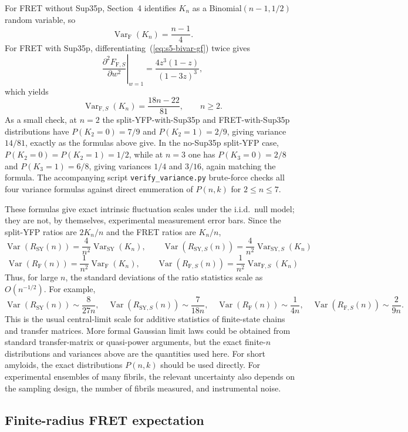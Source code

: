 \documentclass[11pt]{article}
\begin{document}
For FRET without Sup35p, Section~4 identifies $K_n$ as a Binomial$(n-1,1/2)$ random variable, so
\[
\operatorname{Var}_{\text{F}}(K_n)=\frac{n-1}{4}.
\]
For FRET with Sup35p, differentiating~(\ref{eq:s5-bivar-gf}) twice gives
\[
\left. \frac{\partial^2 F_{\text{F},S}}{\partial w^2} \right|_{w=1}
= \frac{4z^3(1-z)}{(1-3z)^3},
\]
which yields
\[
\operatorname{Var}_{\text{F},S}(K_n)=\frac{18n-22}{81},
\qquad n \ge 2.
\]
As a small check, at $n=2$ the split-YFP-with-Sup35p and FRET-with-Sup35p distributions have $P(K_2=0)=7/9$ and $P(K_2=1)=2/9$, giving variance $14/81$, exactly as the formulas above give. In the no-Sup35p split-YFP case, $P(K_2=0)=P(K_2=1)=1/2$, while at $n=3$ one has $P(K_3=0)=2/8$ and $P(K_3=1)=6/8$, giving variances $1/4$ and $3/16$, again matching the formula. The accompanying script \texttt{verify\_variance.py} brute-force checks all four variance formulas against direct enumeration of $P(n,k)$ for $2 \le n \le 7$.

These formulas give exact intrinsic fluctuation scales under the i.i.d.\ null model; they are not, by themselves, experimental measurement error bars. Since the split-YFP ratios are $2K_n/n$ and the FRET ratios are $K_n/n$,
\[
\operatorname{Var}(R_{\text{SY}}(n)) = \frac{4}{n^2}\operatorname{Var}_{\text{SY}}(K_n), \qquad
\operatorname{Var}(R_{\text{SY},S}(n)) = \frac{4}{n^2}\operatorname{Var}_{\text{SY},S}(K_n)
\]
\[
\operatorname{Var}(R_{\text{F}}(n)) = \frac{1}{n^2}\operatorname{Var}_{\text{F}}(K_n), \qquad
\operatorname{Var}(R_{\text{F},S}(n)) = \frac{1}{n^2}\operatorname{Var}_{\text{F},S}(K_n)
\]
Thus, for large $n$, the standard deviations of the ratio statistics scale as $O(n^{-1/2})$. For example,
\[
\operatorname{Var}(R_{\text{SY}}(n)) \sim \frac{8}{27n}, \quad
\operatorname{Var}(R_{\text{SY},S}(n)) \sim \frac{7}{18n}, \quad
\operatorname{Var}(R_{\text{F}}(n)) \sim \frac{1}{4n}, \quad
\operatorname{Var}(R_{\text{F},S}(n)) \sim \frac{2}{9n}.
\]
This is the usual central-limit scale for additive statistics of finite-state chains and transfer matrices. More formal Gaussian limit laws could be obtained from standard transfer-matrix or quasi-power arguments, but the exact finite-$n$ distributions and variances above are the quantities used here. For short amyloids, the exact distributions $P(n,k)$ should be used directly. For experimental ensembles of many fibrils, the relevant uncertainty also depends on the sampling design, the number of fibrils measured, and instrumental noise.

\subsection{Finite-radius FRET expectation}
\end{document}
